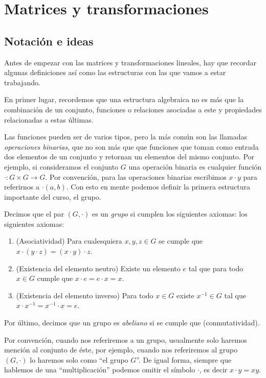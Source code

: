 \chapter{Matrices y transformaciones}

\section{Notación e ideas}

Antes de empezar con las matrices y transformaciones lineales, hay que recordar algunas definiciones así como las estructuras con las que vamos a estar trabajando.

En primer lugar, recordemos que una estructura algebraica no es más que la combinación de un conjunto, funciones o relaciones asociadas a este y propiedades relacionadas a estas últimas.

Las funciones pueden ser de varios tipos, pero la más común son las llamadas \emph{operaciones binarias}, que no son más que que funciones que toman como entrada dos elementos de un conjunto y retornan un elementos del mismo conjunto. Por ejemplo, si consideramos el conjunto $G$ una operación binaria es cualquier función $\cdot \colon  G \times G \to G$. Por convención, para las operaciones binarias escribimos $x \cdot y$  para referirnos a $\cdot(a,b)$. Con esto en mente podemos definir la primera estructura importante del curso, el grupo.

\begin{defi}
  Decimos que el par $(G, \cdot)$ es un \emph{grupo} si cumplen los siguientes axiomas:
  los siguientes axiomas:
  \begin{enumerate}
    \item (Asociatividad) Para cualesquiera $x, y, z \in G$ se cumple que $x\cdot(y\cdot z) = (x\cdot y)\cdot z$.
    \item (Existencia del elemento neutro) Existe un elemento $e$ tal que para todo $x \in G$ cumple que $x\cdot e = e\cdot x = x$.
    \item (Existencia del elemento inverso) Para todo $x \in G$ existe $x^{-1} \in G$ tal que $x\cdot x^{-1} = x^{-1}\cdot x = e$.
  \end{enumerate}

  Por último, decimos que un grupo es \emph{abeliano} si  se cumple que  (conmutatividad).
\end{defi}

Por convención, cuando nos referiremos a un grupo, usualmente solo haremos mención al conjunto de éste, por ejemplo, cuando nos referiremos al grupo $(G, \cdot)$ lo haremos solo como ``el grupo $G$''. De igual forma, siempre que hablemos de una ``multiplicación'' podemos omitir el símbolo $\cdot$, es decir $x \cdot y = xy$.

